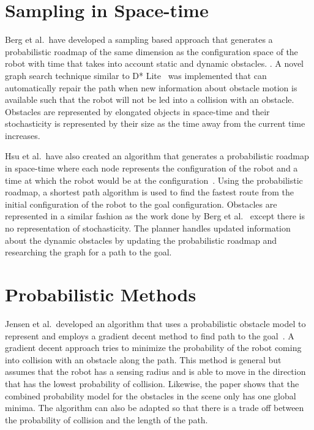 \section{Sampling in Space-time}

Berg et al.\ have developed a sampling based approach that generates a
probabilistic roadmap of the same dimension as the configuration space of the
robot with time that takes into account static and dynamic obstacles.
\cite{van2006anytime}. A novel graph search technique similar to D*
Lite~\cite{koenig2002d} was implemented that can automatically repair the path
when new information about obstacle motion is available such that the robot
will not be led into a collision with an obstacle. Obstacles are represented by
elongated objects in space-time and their stochasticity is represented by their
size as the time away from the current time increases.

Hsu et al.\ have also created an algorithm that generates a probabilistic
roadmap in space-time where each node represents the configuration of the robot
and a time at which the robot would be at the
configuration~\cite{hsu2002randomized}. Using the probabilistic roadmap, a
shortest path algorithm is used to find the fastest route from the initial
configuration of the robot to the goal configuration. Obstacles are represented
in a similar fashion as the work done by Berg et al.~\cite{van2006anytime}
except there is no representation of stochasticity. The planner handles updated
information about the dynamic obstacles by updating the probabilistic roadmap
and researching the graph for a path to the goal.

\section{Probabilistic Methods}

Jensen et al.\ developed an algorithm that uses a probabilistic obstacle model
to represent and employs a gradient decent method to find path to the
goal~\cite{jensen2003motion}.  A gradient decent approach tries to minimize the
probability of the robot coming into collision with an obstacle along the path.
This method is general but assumes that the robot has a sensing radius and is
able to move in the direction that has the lowest probability of collision.
Likewise, the paper shows that the combined probability model for the obstacles
in the scene only has one global minima. The algorithm can also be adapted so
that there is a trade off between the probability of collision and the length
of the path.

